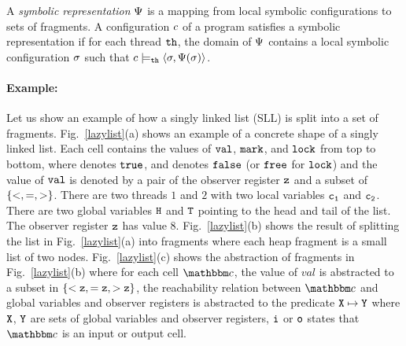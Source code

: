 A {\em symbolic representation} $\Psi$ is a mapping from
local symbolic  configurations to sets of fragments.
A configuration $c$ of a program satisfies a symbolic representation
if for each thread ${\tt th}$, 
the domain of $\Psi$ contains a local symbolic configuration
$\sigma$ such that $c \models_{{\tt th}}
\left\langle\sigma,\Psi(\sigma)\right\rangle$.

\paragraph{Example:} Let us show an example of how a singly linked list (SLL) is split into a set of fragments. Fig.~\ref{lazylist}(a) shows an example of a concrete shape of a singly linked list. Each cell contains the values of $\tt val$, $\tt mark$, and $\tt lock$ from top to bottom, where \tick \; denotes $\tt true$, and \cross \; denotes $\tt false$ (or $\tt free$ for $\tt lock$) and the value of $\tt val$ is denoted by a pair of the observer register $\tt z$ and a subset of $\left\{<, =, >\right\}$. There are two threads $1$ and $2$ with two local variables $\tt c_1$ and $\tt c_2$. There are two global variables $\tt H$ and $\tt T$ pointing to the head and tail of the list. The observer register $\tt z$ has value 8. Fig.~\ref{lazylist}(b) shows the result of splitting the list in Fig.~\ref{lazylist}(a) into fragments where each heap fragment is a small list of two nodes. Fig.~\ref{lazylist}(c) shows the abstraction of fragments in Fig.~\ref{lazylist}(b) where for each cell $\cell$, the value of $val$ is abstracted to a subset in $\tt \{<z, =z, >z\}$, the reachability relation between $\cell$ and global variables and observer registers is abstracted to the predicate $\tt X \mapsto \tt Y$ where $\tt X$, $\tt Y$ are sets of global variables and observer registers, $\tt i$ or $\tt o$ states that $\cell$ is an input or output cell.

